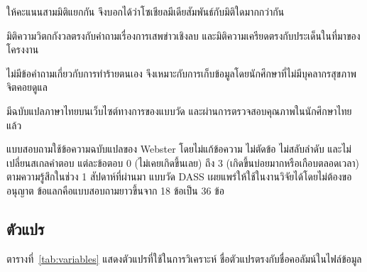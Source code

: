 \begin{subsubitems}
    \item ให้คะแนนสามมิติแยกกัน จึงบอกได้ว่าโซเชียลมีเดียสัมพันธ์กับมิติใดมากกว่ากัน
    \item มิติความวิตกกังวลตรงกับคำถามเรื่องการเสพข่าวเชิงลบ และมิติความเครียดตรงกับประเด็นในที่มาของโครงงาน
    \item ไม่มีข้อคำถามเกี่ยวกับการทำร้ายตนเอง จึงเหมาะกับการเก็บข้อมูลโดยนักศึกษาที่ไม่มีบุคลากรสุขภาพจิตคอยดูแล
    \item มีฉบับแปลภาษาไทยบนเว็บไซต์ทางการของแบบวัด \cite{webster2008thai}
          และผ่านการตรวจสอบคุณภาพในนักศึกษาไทยแล้ว \cite{wittayapun2023validation}
\end{subsubitems}

แบบสอบถามใช้ข้อความฉบับแปลของ Webster \cite{webster2008thai}
โดยไม่แก้ข้อความ ไม่ตัดข้อ ไม่สลับลำดับ และไม่เปลี่ยนสเกลคำตอบ
แต่ละข้อตอบ 0 (ไม่เคยเกิดขึ้นเลย) ถึง 3 (เกิดขึ้นบ่อยมากหรือเกือบตลอดเวลา)
ตามความรู้สึกในช่วง 1 สัปดาห์ที่ผ่านมา แบบวัด DASS เผยแพร่ให้ใช้ในงานวิจัยได้โดยไม่ต้องขออนุญาต
ข้อแลกคือแบบสอบถามยาวขึ้นจาก 18 ข้อเป็น 36 ข้อ

\subsection{ตัวแปร}

ตารางที่~\ref{tab:variables} แสดงตัวแปรที่ใช้ในการวิเคราะห์ ชื่อตัวแปรตรงกับชื่อคอลัมน์ในไฟล์ข้อมูล

